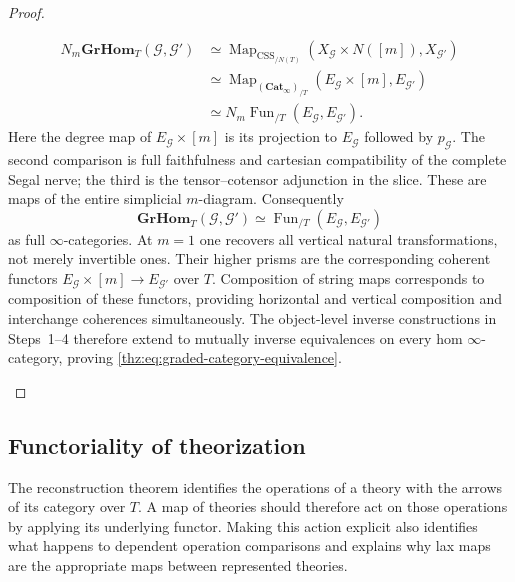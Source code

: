 \documentclass[oneside]{article}
\theoremstyle{plain}
\theoremstyle{definition}
\theoremstyle{remark}
\newcommand{\Cat}{\mathbf{Cat}_{\infty}}
\newcommand{\Fun}{\operatorname{Fun}}
\newcommand{\Map}{\operatorname{Map}}
\begin{document}
\begin{proof}
\begin{enumerate}
\begin{align*}
 N_m\mathbf{GrHom}_T(\mathcal G,\mathcal G')
 &\simeq \Map_{\operatorname{CSS}_{/N(T)}}
       (X_{\mathcal G}\times N([m]),X_{\mathcal G'})\\
 &\simeq \Map_{(\Cat)_{/T}}
       (E_{\mathcal G}\times[m],E_{\mathcal G'})\\
 &\simeq N_m\Fun_{/T}
       (E_{\mathcal G},E_{\mathcal G'}).
\end{align*}
Here the degree map of $E_{\mathcal G}\times[m]$ is its projection
to $E_{\mathcal G}$ followed by $p_{\mathcal G}$. The second
comparison is full faithfulness and cartesian compatibility of the
complete Segal nerve; the third is the tensor--cotensor adjunction in
the slice. These are maps of the entire simplicial $m$-diagram.
Consequently
\[
 \mathbf{GrHom}_T(\mathcal G,\mathcal G')
 \simeq \Fun_{/T}(E_{\mathcal G},E_{\mathcal G'})
\]
as full $\infty$-categories. At $m=1$ one recovers all vertical
natural transformations, not merely invertible ones. Their higher
prisms are the corresponding coherent functors
$E_{\mathcal G}\times[m]\to E_{\mathcal G'}$ over $T$.
Composition of string maps corresponds to composition of these functors,
providing horizontal and vertical composition and interchange
coherences simultaneously. The object-level inverse constructions in
Steps~1--4 therefore extend to mutually inverse equivalences on every
hom $\infty$-category, proving
\eqref{thz:eq:graded-category-equivalence}.\qedhere
\end{enumerate}
\end{proof}

\subsection{Functoriality of theorization}
\label{subsec:theorization-functoriality}

The reconstruction theorem identifies the operations of a theory with
the arrows of its category over $T$. A map of theories should therefore
act on those operations by applying its underlying functor. Making this
action explicit also identifies what happens to dependent operation
comparisons and explains why lax maps are the appropriate maps between
represented theories.
\end{document}
